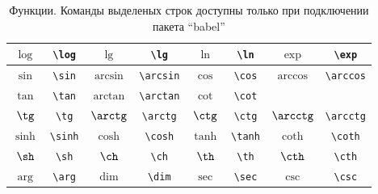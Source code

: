 \begin{table}
	\begin{tabular}{||c|c||c|c||c|c||c|c||}
		\hline $\log$ & \Verb|\log| 
		& $\lg$ & \Verb|\lg| 
		& $\ln$ & \Verb|\ln| 
		& $\exp$ & \Verb|\exp| \\
		\hline  $\sin$ & \Verb|\sin| 
		& $\arcsin$ & \Verb|\arcsin| 
		& $\cos$ & \Verb|\cos| 
		& $\arccos$ & \Verb|\arccos| \\ 
		\hline $\tan$ & \Verb|\tan| 
		& $\arctan$ & \Verb|\arctan| 
		& $\cot$ & \Verb|\cot| 
		& & \\
		\hline\hline \rowcolor{Gray} $\tg$ & \Verb|\tg| 
		& $\arctg$ & \Verb|\arctg| 
		& $\ctg$ & \Verb|\ctg| 
		& $\arcctg$ & \Verb|\arcctg| \\
		\hline\hline $\sinh$ & \Verb|\sinh| 
		& $\cosh$ & \Verb|\cosh| 
		& $\tanh$ & \Verb|\tanh| 
		& $\coth$ & \Verb|\coth| \\
		\hline\hline \rowcolor{Gray} $\sh$ & \Verb|\sh| 
		& $\ch$ & \Verb|\ch| 
		& $\th$ & \Verb|\th| 
		& $\cth$ & \Verb|\cth| \\
		\hline\hline $\arg$ & \Verb|\arg| 
		& $\dim$ & \Verb|\dim|
		& $\sec$ & \Verb|\sec| 
		& $\csc$ & \Verb|\csc| \\ 
		\hline
	\end{tabular}
	\caption{Функции. Команды выделеных строк доступны только при подключении пакета ``babel''}
\end{table}